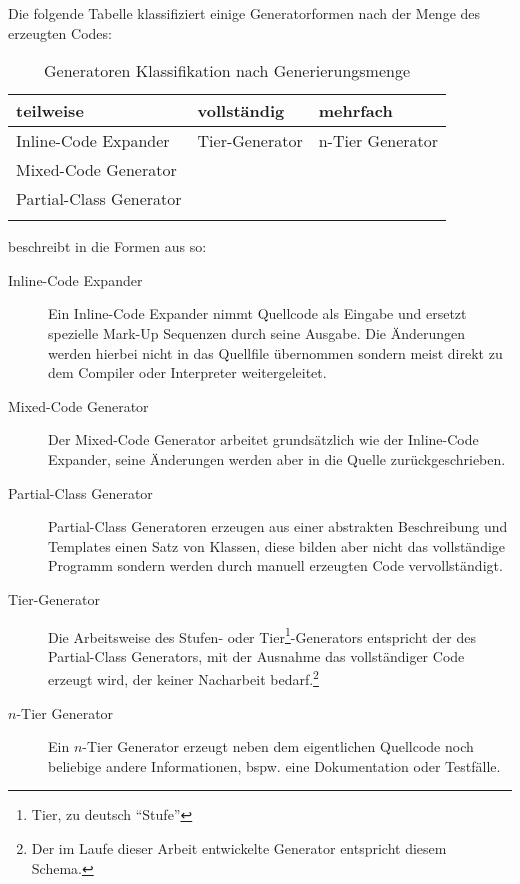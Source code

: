Die folgende Tabelle klassifiziert einige Generatorformen nach der Menge des erzeugten Codes:
\begin{table}[htb]
    \begin{longtable}[c]{l l l}
        \toprule
        \rowcolor{lightgray}
        \textbf{teilweise}   & \textbf{vollständig}     & \textbf{mehrfach}\\
        \midrule
        Inline-Code Expander    & Tier-Generator    & n-Tier Generator\\
        Mixed-Code Generator & &\\
        Partial-Class Generator & & \\
        \bottomrule
        \caption{Generatoren Klassifikation nach Generierungsmenge}
        \label{tab:generatorclassification}
    \end{longtable} 
\end{table}

\citeauthor{herrington2003code} beschreibt in \cite[Kapitel 4][]{herrington2003code} die Formen aus  so:
\begin{description}
    \item[Inline-Code Expander]
        Ein Inline-Code Expander nimmt Quellcode als Eingabe und ersetzt spezielle Mark-Up Sequenzen durch seine Ausgabe. Die Änderungen werden hierbei nicht in das Quellfile übernommen sondern meist direkt zu dem Compiler oder Interpreter weitergeleitet.
    \item[Mixed-Code Generator]
        Der Mixed-Code Generator arbeitet grundsätzlich wie der Inline-Code Expander, seine Änderungen werden aber in die Quelle zurückgeschrieben.
    \item[Partial-Class Generator]
        Partial-Class Generatoren erzeugen aus einer abstrakten Beschreibung und Templates einen Satz von Klassen, diese bilden aber nicht das vollständige Programm sondern werden durch manuell erzeugten Code vervollständigt. %
    \item[Tier-Generator]
        Die Arbeitsweise des Stufen- oder Tier\footnote{Tier, zu deutsch \enquote{Stufe}}-Generators entspricht der des Partial-Class Generators, mit der Ausnahme das vollständiger Code erzeugt wird, der keiner Nacharbeit bedarf.\footnote{Der im Laufe dieser Arbeit entwickelte Generator entspricht diesem Schema.}
    \item[$n$-Tier Generator] 
        Ein $n$-Tier Generator erzeugt neben dem eigentlichen Quellcode noch beliebige andere Informationen, bspw. eine Dokumentation oder Testfälle.
\end{description}


